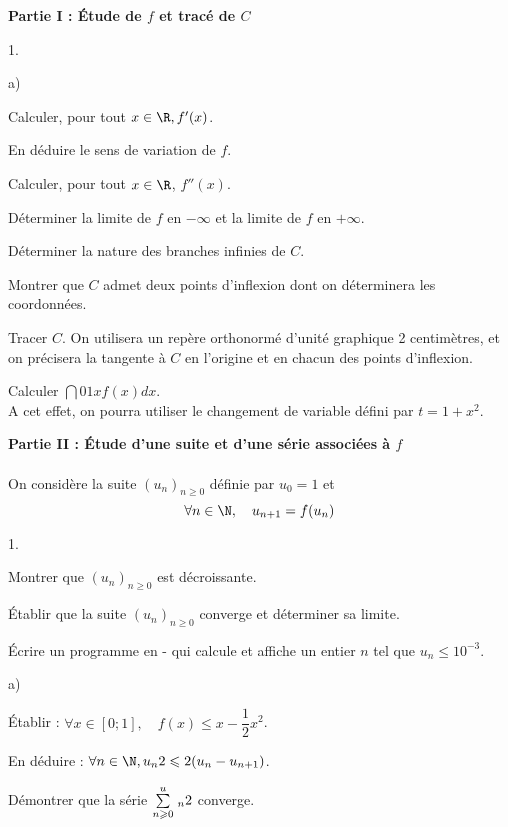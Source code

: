 \documentclass[11pt]{article}%
\begin{document}
{\bf Partie I : Étude de $f$ et tracé de $C$}\\
\begin{noliste}{1.}
 \setlength{\itemsep}{4mm}
\item 
\begin{noliste}{a)}
 \setlength{\itemsep}{2mm}
\item Calculer, pour tout $x\in \R, f'(x)$.
\item En déduire le sens de variation de $f$.
\item Calculer, pour tout $x\in \R$, $f''(x)$.
\end{noliste}
\item Déterminer la limite de $f$ en $-\infty$ et la limite de $f$ en $
+ \infty$.
\item Déterminer la nature des branches infinies de $C$.
\item Montrer que $C$ admet deux points d'inflexion dont on déterminera
les coordonnées.
\item Tracer $C$. On utilisera un repère orthonormé d'unité graphique 2
centimètres, et on précisera la tangente à $C$ en l'origine et en
chacun des points d'inflexion.
\item Calculer $\dint{0}{1}xf(x)dx$. \\
A cet effet, on pourra utiliser le changement de variable défini par $t
= 1 + x^{2}$.\\
\end{noliste}

{\bf Partie II : Étude d'une suite et d'une série associées à $f$}\\
\\
On considère la suite $(u_{n})_{n\geq 0}$ définie par $u_{0} = 1$ et 
\[
\forall n\in \N, \quad u_{n + 1} = f(u_{n})
\]
\begin{noliste}{1.}
 \setlength{\itemsep}{4mm}
\item Montrer que $(u_{n})_{n\geq 0}$ est décroissante.
\item Établir que la suite $(u_{n})_{n\geq 0}$ converge et déterminer
sa limite.
\item Écrire un programme en -\Scilab{} qui calcule et affiche un
entier $n$ tel que $u_{n}\leq 10^{-3}$.
\item
\begin{noliste}{a)}
 \setlength{\itemsep}{2mm}
\item Établir : $\forall x\in [0;1], \quad f(x)\leq
x-\dfrac{1}{2}x^{2}$.
\item En déduire : $\forall n\in \N, u_{n}{2}\leq2(u_{n}-u_{n + 1})$.
\item Démontrer que la série ${\textstyle\sum\limits_{n\geqslant 0}^{u}}\hspace{.1cm}_{n}{2}$ converge.\\
\end{noliste}
\end{noliste}
\end{document}
